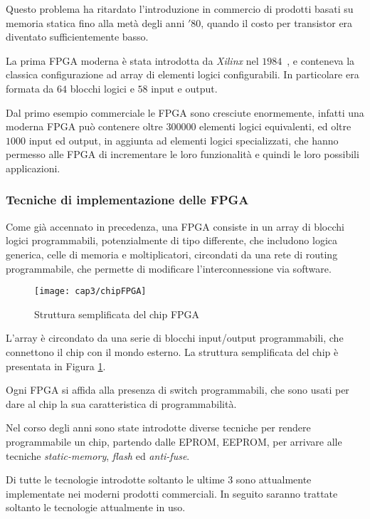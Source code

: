 Questo problema ha ritardato l'introduzione in commercio di prodotti basati su memoria statica fino alla metà degli anni $'80$, quando il costo per transistor era diventato sufficientemente basso.

La prima FPGA moderna è stata introdotta da \textit{Xilinx} nel $1984$~\cite{reconfgate}, e conteneva la classica configurazione ad array di elementi logici configurabili. In particolare era formata da $64$ blocchi logici e $58$ input e output. 

Dal primo esempio commerciale le FPGA sono cresciute enormemente, infatti una moderna FPGA può contenere oltre $300000$ elementi logici equivalenti, ed oltre $1000$ input ed output, in aggiunta ad elementi logici specializzati, che hanno permesso alle FPGA di incrementare le loro funzionalità e quindi le loro possibili applicazioni.

\subsubsection{Tecniche di implementazione delle FPGA}
Come già accennato in precedenza, una FPGA consiste in un array di blocchi logici programmabili, potenzialmente di tipo differente, che includono logica generica, celle di memoria e moltiplicatori, circondati da una rete di routing programmabile, che permette di modificare l'interconnessione via software.

\begin{figure}  
  \begin{center}
    \texttt{[image: cap3/chipFPGA]}
    \caption{Struttura semplificata del chip FPGA}
    \label{chipFPGA}
  \end{center}
\end{figure}
L'array è circondato da una serie di blocchi input/output programmabili, che connettono il chip con il mondo esterno. La struttura semplificata del chip è presentata in Figura \ref{chipFPGA}.

Ogni FPGA si affida alla presenza di switch programmabili, che sono usati per dare al chip la sua caratteristica di programmabilità.

Nel corso degli anni sono state introdotte diverse tecniche per rendere programmabile un chip, partendo dalle EPROM, EEPROM, per arrivare alle tecniche  \textit{static-memory}, \textit{flash} ed \textit{anti-fuse}.

Di tutte le tecnologie introdotte soltanto le ultime $3$ sono attualmente implementate nei moderni prodotti commerciali. In seguito saranno trattate soltanto le tecnologie attualmente in uso.

